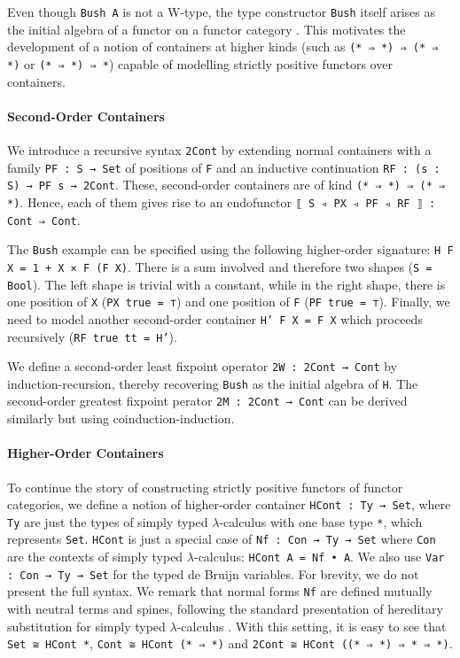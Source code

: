 \documentclass{easychair}
\begin{document}
Even though \texttt{Bush A} is not a W-type, the type constructor \texttt{Bush} itself arises
as the initial algebra of a functor on a functor category \cite{bird1998nested,
bird1999generalised}. This motivates the development of a notion of containers
at higher kinds (such as \texttt{(* ⇒ *) ⇒ (* ⇒ *)} or \texttt{(* ⇒ *) ⇒ *}) capable of modelling
strictly positive functors over containers.


\paragraph{Second-Order Containers}
We introduce a recursive syntax \texttt{2Cont} by extending normal containers with a family
\texttt{PF : S → Set} of positions of \texttt{F} and an inductive continuation \texttt{RF : (s : S) → PF s → 2Cont}.
These, second-order containers are of kind \texttt{(* ⇒ *) ⇒ (* ⇒ *)}. Hence, each of them gives rise to an endofunctor \texttt{⟦ S ◃ PX ◃ PF ◃ RF ⟧ : Cont ⇒ Cont}.

The \texttt{Bush} example can be specified using the following higher-order signature:
\texttt{H F X = 1 + X × F (F X)}. There is a sum involved and therefore two shapes
(\texttt{S = Bool}). The left shape is trivial with a constant, while in the right
shape, there is one position of \texttt{X} (\texttt{PX true = ⊤}) and one position of
\texttt{F} (\texttt{PF true = ⊤}). Finally, we need to model another second-order container
\texttt{H' F X = F X} which proceeds recursively (\texttt{RF true tt = H'}).

We define a second-order least fixpoint operator \texttt{2W : 2Cont → Cont} by
induction-recursion, thereby recovering \texttt{Bush} as the initial algebra of
\texttt{H}. The second-order greatest fixpoint perator \texttt{2M : 2Cont → Cont} 
can be derived similarly but using coinduction-induction.

\paragraph{Higher-Order Containers}
To continue the story of constructing strictly positive functors of functor
categories, we define a notion of higher-order container \texttt{HCont : Ty → Set}, where
\texttt{Ty} are just the types of simply typed $\lambda$-calculus with one base type
\texttt{*}, which represents \texttt{Set}. \texttt{HCont} is just a special case of
\texttt{Nf : Con → Ty → Set} where \texttt{Con} are the contexts of simply typed
$\lambda$-calculus: \texttt{HCont A = Nf • A}. We also use \texttt{Var : Con → Ty → Set}
for the typed de Bruijn variables. For brevity, we do not present the full
syntax. We remark that normal forms \texttt{Nf} are defined mutually with neutral terms
and spines, following the standard presentation of hereditary substitution for
simply typed $\lambda$-calculus \cite{keller2010normalization}. With this setting,
it is easy to see that \texttt{Set ≅ HCont *}, \texttt{Cont ≅ HCont (* ⇒ *)} and
\texttt{2Cont ≅ HCont ((* ⇒ *) ⇒ * ⇒ *)}. 
\end{document}
